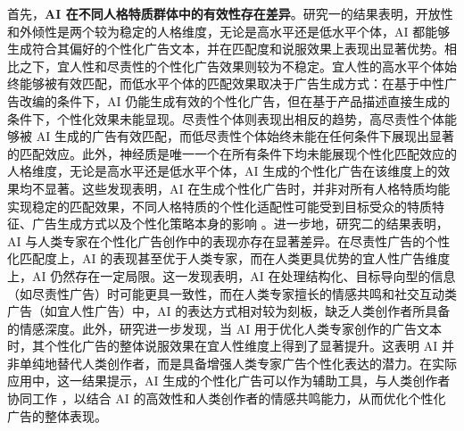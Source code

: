 首先，\textbf{AI 在不同人格特质群体中的有效性存在差异}。研究一的结果表明，开放性和外倾性是两个较为稳定的人格维度，无论是高水平还是低水平个体，AI 都能够生成符合其偏好的个性化广告文本，并在匹配度和说服效果上表现出显著优势。相比之下，宜人性和尽责性的个性化广告效果则较为不稳定。宜人性的高水平个体始终能够被有效匹配，而低水平个体的匹配效果取决于广告生成方式：在基于中性广告改编的条件下，AI 仍能生成有效的个性化广告，但在基于产品描述直接生成的条件下，个性化效果未能显现。尽责性个体则表现出相反的趋势，高尽责性个体能够被 AI 生成的广告有效匹配，而低尽责性个体始终未能在任何条件下展现出显著的匹配效应。此外，神经质是唯一一个在所有条件下均未能展现个性化匹配效应的人格维度，无论是高水平还是低水平个体，AI 生成的个性化广告在该维度上的效果均不显著。这些发现表明，AI 在生成个性化广告时，并非对所有人格特质均能实现稳定的匹配效果，不同人格特质的个性化适配性可能受到目标受众的特质特征、广告生成方式以及个性化策略本身的影响 \citep{winter2021effects}。进一步地，研究二的结果表明，AI 与人类专家在个性化广告创作中的表现亦存在显著差异。在尽责性广告的个性化匹配度上，AI 的表现甚至优于人类专家，而在人类更具优势的宜人性广告维度上，AI 仍然存在一定局限。这一发现表明，AI 在处理结构化、目标导向型的信息（如尽责性广告）时可能更具一致性，而在人类专家擅长的情感共鸣和社交互动类广告（如宜人性广告）中，AI 的表达方式相对较为刻板，缺乏人类创作者所具备的情感深度。此外，研究进一步发现，当 AI 用于优化人类专家创作的广告文本时，其个性化广告的整体说服效果在宜人性维度上得到了显著提升。这表明 AI 并非单纯地替代人类创作者，而是具备增强人类专家广告个性化表达的潜力。在实际应用中，这一结果提示，AI 生成的个性化广告可以作为辅助工具，与人类创作者协同工作 \citep{yoon2024designing}，以结合 AI 的高效性和人类创作者的情感共鸣能力，从而优化个性化广告的整体表现。

